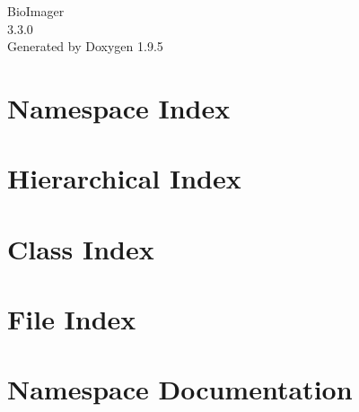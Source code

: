 \documentclass[twoside]{book}
\newcommand{\+}{\discretionary{\mbox{\scriptsize$\hookleftarrow$}}{}{}}
\newcommand{\clearemptydoublepage}{%
    \newpage{\pagestyle{empty}\cleardoublepage}%
  }
\begin{document}
  \raggedbottom
    \hypersetup{pageanchor=false,
                bookmarksnumbered=true,
                pdfencoding=unicode
               }
  \begin{titlepage}
  \vspace*{7cm}
  \begin{center}%
  {\Large Bio\+Imager}\\
  [1ex]\large 3.\+3.\+0 \\
  \vspace*{1cm}
  {\large Generated by Doxygen 1.9.5}\\
  \end{center}
  \end{titlepage}
  \clearemptydoublepage
  \tableofcontents
  \clearemptydoublepage
  \hypersetup{pageanchor=true}
\chapter{Namespace Index}

\chapter{Hierarchical Index}

\chapter{Class Index}

\chapter{File Index}

\chapter{Namespace Documentation}




\end{document}
